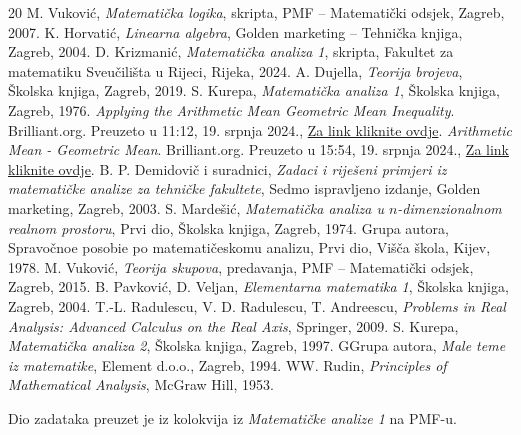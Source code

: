 \newpage
\fancyhead[RO, RE]{}
\fancyhead[LO, LE]{}
\renewcommand{\headrulewidth}{0pt}
\begin{thebibliography}{20}
M. Vuković, \textit{Matematička logika}, skripta, PMF -- Matematički odsjek, Zagreb, 2007.
K. Horvatić, \textit{Linearna algebra}, Golden marketing -- Tehnička knjiga, Zagreb, 2004.
D. Krizmanić, \textit{Matematička analiza 1}, skripta, Fakultet za matematiku Sveučilišta u Rijeci, Rijeka, 2024.
A. Dujella, \textit{Teorija brojeva}, Školska knjiga, Zagreb, 2019.
S. Kurepa, \textit{Matematička analiza 1}, Školska knjiga, Zagreb, 1976.
\textit{Applying the Arithmetic Mean Geometric Mean Inequality}. Brilliant.org. Preuzeto u 11:12, 19. srpnja 2024., \href{https://brilliant.org/wiki/applying-the-arithmetic-mean-geometric-mean/}{Za link kliknite ovdje}.
\textit{Arithmetic Mean - Geometric Mean}. Brilliant.org. Preuzeto u 15:54, 19. srpnja 2024., \href{https://brilliant.org/wiki/arithmetic-mean-geometric-mean/}{Za link kliknite ovdje}.
B. P. Demidovič i suradnici, \textit{Zadaci i riješeni primjeri iz matematičke analize za tehničke fakultete}, Sedmo ispravljeno izdanje, Golden marketing, Zagreb, 2003.
 S. Mardešić, \textit{Matematička analiza u \(n\)-dimenzionalnom realnom prostoru}, Prvi dio, Školska knjiga, Zagreb, 1974.
 Grupa autora, \foreignlanguage{russian}{Spravočnoe posobie po matematičeskomu analizu, Prvi dio, Višča škola, Kijev, 1978.}
 M. Vuković, \textit{Teorija skupova}, predavanja, PMF -- Matematički odsjek, Zagreb, 2015.
 B. Pavković, D. Veljan, \textit{Elementarna matematika 1}, Školska knjiga, Zagreb, 2004.
 T.-L. Radulescu, V. D. Radulescu, T. Andreescu, \textit{Problems in Real Analysis: Advanced Calculus on the Real Axis}, Springer, 2009.
 S. Kurepa, \textit{Matematička analiza 2}, Školska knjiga, Zagreb, 1997.
\bibitem[15] GGrupa autora, \textit{Male teme iz matematike}, Element d.o.o., Zagreb, 1994.
\bibitem[16] WW. Rudin, \textit{Principles of Mathematical Analysis}, McGraw Hill, 1953.
\end{thebibliography}
Dio zadataka preuzet je iz kolokvija iz \textit{Matematičke analize 1} na PMF-u.